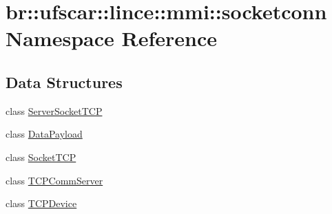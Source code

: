 \hypertarget{namespacebr_1_1ufscar_1_1lince_1_1mmi_1_1socketconn}{
\section{br::ufscar::lince::mmi::socketconn Namespace Reference}
\label{namespacebr_1_1ufscar_1_1lince_1_1mmi_1_1socketconn}
}
\subsection*{Data Structures}
\begin{DoxyCompactItemize}
\item 
class \hyperlink{classbr_1_1ufscar_1_1lince_1_1mmi_1_1socketconn_1_1ServerSocketTCP}{ServerSocketTCP}
\item 
class \hyperlink{classbr_1_1ufscar_1_1lince_1_1mmi_1_1socketconn_1_1DataPayload}{DataPayload}
\item 
class \hyperlink{classbr_1_1ufscar_1_1lince_1_1mmi_1_1socketconn_1_1SocketTCP}{SocketTCP}
\item 
class \hyperlink{classbr_1_1ufscar_1_1lince_1_1mmi_1_1socketconn_1_1TCPCommServer}{TCPCommServer}
\item 
class \hyperlink{classbr_1_1ufscar_1_1lince_1_1mmi_1_1socketconn_1_1TCPDevice}{TCPDevice}
\end{DoxyCompactItemize}
